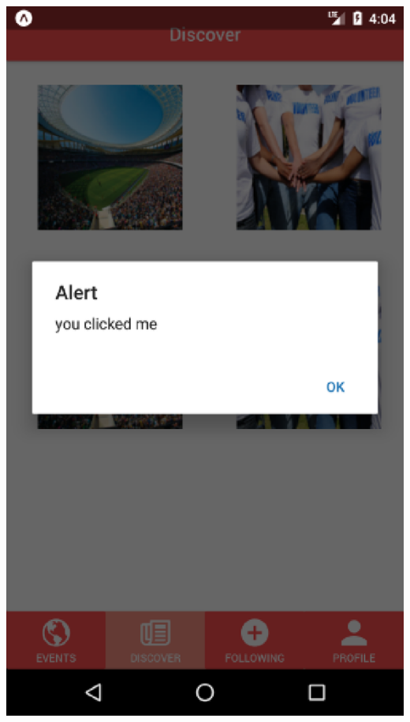 \documentclass[letterpaper, 10pt,titlepage]{article}
\begin{document}
\includegraphics{Following_Screen_2.eps}
\end{document}
